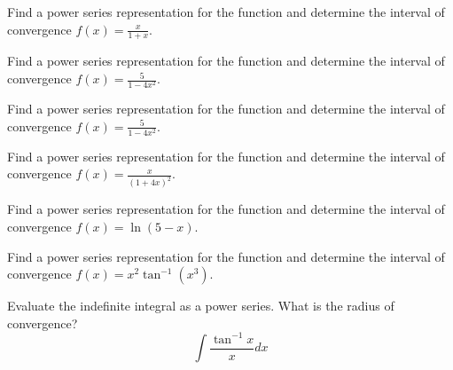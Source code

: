 \documentclass[
  course = {{MATH102 Calculus II}},
  quartile = {{2}},
  assignment = 25,%
  topic = {{11.9: Represenation of functions as Power Series}},
  firstexercise = 1,
  term = 202
]{aga-homework}
\begin{document}
\newpage

\problem Find a power series representation for the function and determine the interval of convergence $\displaystyle f(x)=\frac{x}{1+x}$.

\newpage

\problem Find a power series representation for the function and determine the interval of convergence $\displaystyle f(x)=\frac{5}{1-4x^2}$.

\newpage

\problem Find a power series representation for the function and determine the interval of convergence $\displaystyle f(x)=\frac{5}{1-4x^2}$.

\newpage

\problem Find a power series representation for the function and determine the interval of convergence $\displaystyle f(x)=\frac{x}{(1+4x)^2}$.

\newpage

\problem Find a power series representation for the function and determine the interval of convergence $\displaystyle f(x)=\ln(5-x)$.

\newpage

\problem Find a power series representation for the function and determine the interval of convergence $\displaystyle f(x)=x^2\tan^{-1}(x^3)$.

\newpage

\problem Evaluate the indefinite integral as a power series. What is the radius of convergence?
\[
\displaystyle
\int \frac{\tan^{-1}x}{x} dx
\]

\newpage
\afterpage{\null\newpage}

\afterpage{\null\newpage}

\afterpage{\null\newpage}
\end{document}

